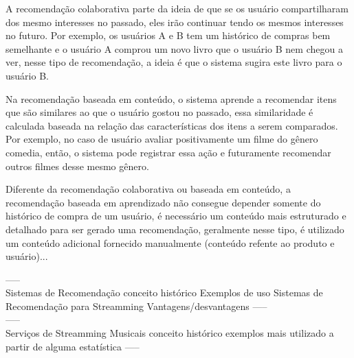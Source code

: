 \documentclass{article}
\begin{document}
A recomendação colaborativa parte da ideia de que se os usuário compartilharam dos mesmo interesses no passado, eles irão continuar tendo os mesmos interesses no futuro. Por exemplo, os usuários A e B tem um histórico de compras bem semelhante e o usuário A comprou um novo livro que o usuário B nem chegou a ver, nesse tipo de recomendação, a ideia é que o sistema sugira este livro para o usuário B. \cite{jannach2010recommender}

Na recomendação baseada em conteúdo, o sistema aprende a recomendar itens que são similares ao que o usuário gostou no passado, essa similaridade é calculada baseada na relação das características dos itens a serem comparados. Por exemplo, no caso de usuário avaliar positivamente um filme do gênero comedia, então, o sistema pode registrar essa ação e futuramente recomendar outros filmes desse mesmo gênero. \cite{ricci2011introduction}

Diferente da recomendação colaborativa ou baseada em conteúdo, a recomendação baseada em aprendizado não consegue depender somente do histórico de compra de um usuário, é necessário um conteúdo mais estruturado e detalhado para ser gerado uma recomendação, geralmente nesse tipo, é utilizado um conteúdo adicional fornecido manualmente (conteúdo refente ao produto e usuário)...

----- \\

Sistemas de Recomendação
   conceito
   histórico
   Exemplos de uso
   Sistemas de Recomendação para Streamming
   Vantagens/desvantagens
----- \\






----- \\

Serviços de Streamming Musicais
  conceito
  histórico
  exemplos
  mais utilizado a partir de alguma estatística
----- \\


\end{document}
